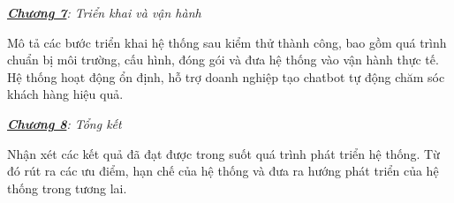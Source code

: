 \vspace{0.5cm}

\textit{\underline{\textbf{Chương 7}}: Triển khai và vận hành}

Mô tả các bước triển khai hệ thống sau kiểm thử thành công, bao gồm quá trình chuẩn bị môi trường, cấu hình, đóng gói và đưa hệ thống vào vận hành thực tế. Hệ thống hoạt động ổn định, hỗ trợ doanh nghiệp tạo chatbot tự động chăm sóc khách hàng hiệu quả. 
\vspace{0.5cm}

\textit{\underline{\textbf{Chương 8}}: Tổng kết}

Nhận xét các kết quả đã đạt được trong suốt quá trình phát triển hệ thống. Từ đó rút ra các ưu điểm, hạn chế của hệ thống và đưa ra hướng phát triển của hệ thống trong tương lai.


